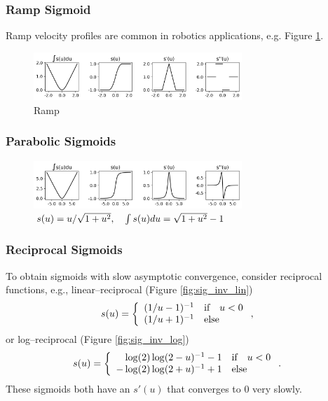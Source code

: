 \documentclass{article}
\begin{document}
\clearpage

\subsubsection{Ramp Sigmoid}
    Ramp velocity profiles are common in robotics applications,
    e.g. Figure \ref{fig:sig_ramp}.
    \begin{figure}[h!]
        \centering
        \includegraphics[width=0.7\textwidth]{./figs/nn/sig/trap.png}
        \caption{Ramp}
        \label{fig:sig_ramp}
    \end{figure} 

\subsubsection{Parabolic Sigmoids}
    \begin{figure}[h!]
        \centering
        \includegraphics[width=0.7\textwidth]{./figs/nn/sig/parabola.png}
        \caption{$s(u)=u/\sqrt{1+u^2},\quad \int s(u)du = \sqrt{1+u^2}-1$}
        \label{fig:sig_parabola}
    \end{figure}

\subsubsection{Reciprocal Sigmoids}

    To obtain sigmoids with slow asymptotic convergence,
    consider reciprocal functions, e.g., linear--reciprocal (Figure \ref{fig:sig_inv_lin})
    \begin{align*}
        s(u)&=
        \left\{
        \begin{array}{lllllllllllllllllll}
                (1/u-1)^{-1} & \text{if}\quad u<0\\
        (1/u+1)^{-1} & \text{else}
        \end{array}    
        \right.,
    \end{align*}
    or log--reciprocal (Figure \ref{fig:sig_inv_log})
    \begin{align*}
        s(u)&=
        \left\{
        \arr{
                \minus\log(2)
                \log(2-u)^{-1}-1 & \text{if}\quad u<0\\
        -\log(2)\log(2+u)^{-1}+1 & \text{else}
        }    
        \right..
    \end{align*}
    These sigmoids both have an $s'(u)$ that converges to 0 very slowly.
\end{document}
